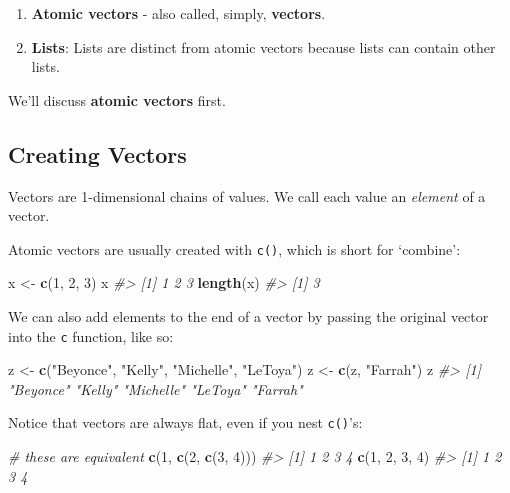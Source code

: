 \documentclass[]{book}
\newenvironment{Shaded}{\begin{snugshade}}{\end{snugshade}}
\newcommand{\KeywordTok}[1]{\textcolor[rgb]{0.13,0.29,0.53}{\textbf{#1}}}
\newcommand{\DecValTok}[1]{\textcolor[rgb]{0.00,0.00,0.81}{#1}}
\newcommand{\StringTok}[1]{\textcolor[rgb]{0.31,0.60,0.02}{#1}}
\newcommand{\CommentTok}[1]{\textcolor[rgb]{0.56,0.35,0.01}{\textit{#1}}}
\newcommand{\NormalTok}[1]{#1}
\providecommand{\tightlist}{%
  \setlength{\itemsep}{0pt}\setlength{\parskip}{0pt}}
\begin{document}
\begin{enumerate}
\def\labelenumi{\arabic{enumi}.}
\tightlist
\item
  \textbf{Atomic vectors} - also called, simply, \textbf{vectors}.
\item
  \textbf{Lists}: Lists are distinct from atomic vectors because lists
  can contain other lists.
\end{enumerate}

We'll discuss \textbf{atomic vectors} first.

\subsection{Creating Vectors}\label{creating-vectors}

Vectors are 1-dimensional chains of values. We call each value an
\emph{element} of a vector.

Atomic vectors are usually created with \texttt{c()}, which is short for
`combine':

\begin{Shaded}
\begin{Highlighting}[]
\NormalTok{x <-}\StringTok{ }\KeywordTok{c}\NormalTok{(}\DecValTok{1}\NormalTok{, }\DecValTok{2}\NormalTok{, }\DecValTok{3}\NormalTok{)}
\NormalTok{x}
\CommentTok{#> [1] 1 2 3}
\KeywordTok{length}\NormalTok{(x)}
\CommentTok{#> [1] 3}
\end{Highlighting}
\end{Shaded}

We can also add elements to the end of a vector by passing the original
vector into the \texttt{c} function, like so:

\begin{Shaded}
\begin{Highlighting}[]
\NormalTok{z <-}\StringTok{ }\KeywordTok{c}\NormalTok{(}\StringTok{"Beyonce"}\NormalTok{, }\StringTok{"Kelly"}\NormalTok{, }\StringTok{"Michelle"}\NormalTok{, }\StringTok{"LeToya"}\NormalTok{)}
\NormalTok{z <-}\StringTok{ }\KeywordTok{c}\NormalTok{(z, }\StringTok{"Farrah"}\NormalTok{)}
\NormalTok{z}
\CommentTok{#> [1] "Beyonce"  "Kelly"    "Michelle" "LeToya"   "Farrah"}
\end{Highlighting}
\end{Shaded}

Notice that vectors are always flat, even if you nest \texttt{c()}'s:

\begin{Shaded}
\begin{Highlighting}[]
\CommentTok{# these are equivalent}
\KeywordTok{c}\NormalTok{(}\DecValTok{1}\NormalTok{, }\KeywordTok{c}\NormalTok{(}\DecValTok{2}\NormalTok{, }\KeywordTok{c}\NormalTok{(}\DecValTok{3}\NormalTok{, }\DecValTok{4}\NormalTok{)))}
\CommentTok{#> [1] 1 2 3 4}
\KeywordTok{c}\NormalTok{(}\DecValTok{1}\NormalTok{, }\DecValTok{2}\NormalTok{, }\DecValTok{3}\NormalTok{, }\DecValTok{4}\NormalTok{)}
\CommentTok{#> [1] 1 2 3 4}
\end{Highlighting}
\end{Shaded}
\end{document}
